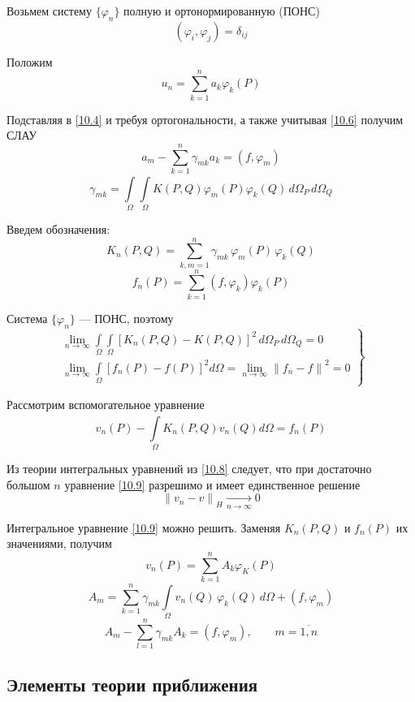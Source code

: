 \documentclass[12pt, a4paper]{article}
\newcommand{\Int}{\int\limits}
\newcommand{\Sum}{\sum\limits}
\begin{document}
Возьмем систему $\{ \varphi_n \}$ полную и ортонормированную (ПОНС)
\[ (\varphi_i, \varphi_j) = \delta_{ij} \label{10.6} \tag{10.6} \]

Положим
\[ u_n = \Sum_{k=1}^{n}a_k \varphi_k (P) \]

Подставляя в \eqref{10.4} и требуя ортогональности, а также учитывая \eqref{10.6} получим СЛАУ
\[ a_m - \Sum_{k=1}^{n} \gamma_{mk} a_k =  (f, \varphi_m) \label{10.7} \tag{10.7} \]
\[ \gamma_{mk} = \Int_{\Omega}^{}\Int_{\Omega}^{} K(P, Q) \varphi_m (P) \varphi_k (Q) \, d\Omega_P \, d\Omega_Q \]

Введем обозначения:
\[ K_n(P, Q) = \Sum_{k, m=1}^n \gamma_{mk} \, \varphi_m (P) \, \varphi_k (Q) \]
\[ f_n(P) = \Sum_{k=1}^{n} (f, \varphi_k) \varphi_k (P) \]

Система $\{ \varphi_n \}$ --- ПОНС, поэтому
\[ \left. \begin{array}{l}
	\underset{n \rightarrow \infty}{\lim} \Int_{\Omega}^{} \Int_{\Omega}^{} {\left[K_n (P, Q) - K(P, Q)\right]}^2 \, d \Omega_P \, d \Omega_Q = 0 \\
	\underset{n \rightarrow \infty}{\lim} \Int_{\Omega}^{} {\left[ f_n(P) - f(P) \right]}^2 d\Omega = \underset{n \rightarrow \infty}{\lim} {\| f_n - f \|}^2 = 0
\end{array} \right\} \label{10.8} \tag{10.8} \]

Рассмотрим вспомогательное уравнение
\[ v_n (P) - \Int_{\Omega}^{} K_n (P,Q) v_n (Q)  d\Omega = f_n(P) \label{10.9} \tag{10.9} \]

Из теории интегральных уравнений из \eqref{10.8} следует, что при достаточно большом $n$ уравнение \eqref{10.9} разрешимо и имеет единственное решение
\[ {\|v_n - v\|}_H \xrightarrow[n \rightarrow \infty]{} 0 \]

Интегральное уравнение \eqref{10.9} можно решить. Заменяя $K_n(P,Q)$ и $f_n(P)$ их значениями, получим
\[ v_n(P) = \Sum_{k=1}^{n} A_k \varphi_K (P) \]
\[ A_m = \Sum_{k=1}^{n} \gamma_{mk} \Int_{\Omega}^{} v_n (Q) \, \varphi_k(Q) \, d\Omega + (f, \varphi_m) \]
\[ A_m -\Sum_{l=1}^{n} \gamma_{mk} A_k = (f, \varphi_m), \qquad m = \overline{1,n} \]

\subsection{Элементы теории приближения}
\end{document}
